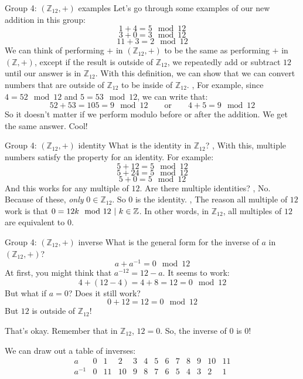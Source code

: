\begin{namedframe}{Group 4: $(\mathbb{Z}_{12}, +)$ examples}
	Let's go through some examples of our new addition in this group:
	\[1 + 4 = 5 \mod 12\]
	\[3 + 0 = 3 \mod 12\]
	\[11 + 3 = 2 \mod 12\]
	We can think of performing $+$ in $(\mathbb{Z}_{12}, +)$ to be the same as performing $+$ in $(\mathbb{Z}, +)$, except if the result is outside of $\mathbb{Z}_{12}$, we repeatedly add or subtract $12$ until our answer is in $\mathbb{Z}_{12}$. With this definition, we can show that we can convert numbers that are outside of $\mathbb{Z}_{12}$ to be inside of $\mathbb{Z}_{12}$.
	\sep
	For example, since $4 = 52 \mod 12$ and $5 = 53 \mod 12$, we can write that:
	\[52 + 53 = 105 = 9 \mod 12 \qquad \text{or} \qquad 4 + 5 = 9 \mod 12\]
	So it doesn't matter if we perform modulo before or after the addition. We get the same answer. Cool!
\end{namedframe}
\begin{namedframe}{Group 4: $(\mathbb{Z}_{12}, +)$ identity}
	What is the identity in $\mathbb{Z}_{12}$?
	\sep
	With this, multiple numbers satisfy the property for an identity.
	For example:
	\[5 + 12 = 5 \mod 12\]
	\[5 + 24 = 5 \mod 12\]
	\[5 + 0 = 5 \mod 12\]
	And this works for any multiple of $12$. Are there multiple identities?
	\sep
	No. Because of these, \emph{only} $0 \in \mathbb{Z}_{12}$. So $0$ is the identity.
	\sep
	The reason all multiple of $12$ work is that $0 = 12k \mod 12 \ |\  k \in \mathbb{Z}$. In other words, in $\mathbb{Z}_{12}$, all multiples of $12$ are equivalent to $0$.
\end{namedframe}
\begin{namedframe}{Group 4: $(\mathbb{Z}_{12}, +)$ inverse}
	What is the general form for the inverse of $a$ in $(\mathbb{Z}_{12}, +)$?
	\[a + a^{-1} = 0 \mod 12\]
	\pause
	At first, you might think that $a^{-12} = 12 - a$. It seems to work:
	\[4 + (12 - 4) = 4 + 8 = 12 = 0 \mod 12\]
	But what if $a = 0$? Does it still work?
	\[0 + 12 = 12 = 0 \mod 12\]
	\pause
	But $12$ is outside of $\mathbb{Z}_{12}$!

	That's okay. Remember that in $\mathbb{Z}_{12}$, $12 = 0$. So, the inverse of $0$ is $0$!

	We can draw out a table of inverses:
	\begin{equation*}
		\begin{array}{c|cccccccccccc}
			a      & 0 & 1  & 2  & 3 & 4 & 5 & 6 & 7 & 8 & 9 & 10 & 11\\\hline
			a^{-1} & 0 & 11 & 10 & 9 & 8 & 7 & 6 & 5 & 4 & 3 &  2 &  1
		\end{array}
	\end{equation*}
\end{namedframe}
